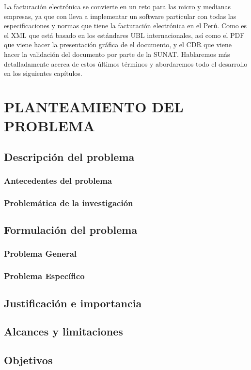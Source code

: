 \documentclass[12pt,a4paper,openany,oneside]{book}
\begin{document}
    La facturación electrónica se convierte en un reto para las micro y medianas empresas, ya que con lleva a implementar un software particular con todas las especificaciones y normas que tiene la facturación electrónica en el Perú. Como es el XML que está basado en los estándares UBL internacionales, así como el PDF que viene hacer la presentación gráfica de el documento, y el CDR que viene hacer la validación del documento por parte de la SUNAT. Hablaremos más detalladamente acerca de estos últimos términos y abordaremos todo el desarrollo en los siguientes capítulos.

    \mainmatter
    \chapter{PLANTEAMIENTO DEL PROBLEMA}
        \section{Descripción del problema}
            \subsection{Antecedentes del problema}                
            \subsection{Problemática de la investigación}
        \section{Formulación del problema}
            \subsection{Problema General}
            \subsection{Problema Específico}            
        \section{Justificación e importancia}
        \section{Alcances y limitaciones}
        \section{Objetivos}
\end{document}
